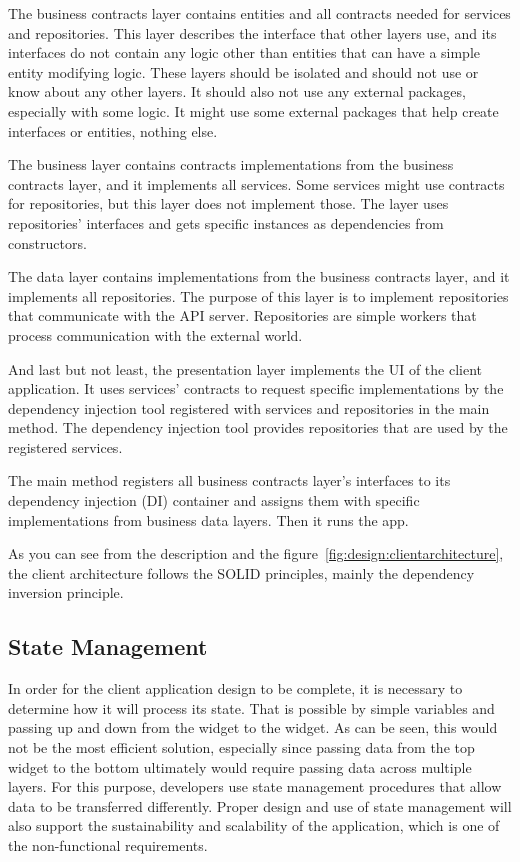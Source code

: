 The business contracts layer contains entities and all contracts needed for services and repositories.
This layer describes the interface that other layers use, and its interfaces do not contain any logic other than entities that can have a simple entity modifying logic.
These layers should be isolated and should not use or know about any other layers.
It should also not use any external packages, especially with some logic.
It might use some external packages that help create interfaces or entities, nothing else.

The business layer contains contracts implementations from the business contracts layer, and it implements all services.
Some services might use contracts for repositories, but this layer does not implement those.
The layer uses repositories' interfaces and gets specific instances as dependencies from constructors.

The data layer contains implementations from the business contracts layer, and it implements all repositories.
The purpose of this layer is to implement repositories that communicate with the API server.
Repositories are simple workers that process communication with the external world.

And last but not least, the presentation layer implements the UI of the client application.
It uses services' contracts to request specific implementations by the dependency injection tool registered with services and repositories in the main method.
The dependency injection tool provides repositories that are used by the registered services.

The main method registers all business contracts layer's interfaces to its dependency injection (DI) container and assigns them with specific implementations from business data layers.
Then it runs the app.

As you can see from the description and the figure~\ref{fig:design:clientarchitecture}, the client architecture follows the SOLID principles, mainly the dependency inversion principle. 

\subsection{State Management}

In order for the client application design to be complete, it is necessary to determine how it will process its state.
That is possible by simple variables and passing up and down from the widget to the widget.
As can be seen, this would not be the most efficient solution, especially since passing data from the top widget to the bottom ultimately would require passing data across multiple layers.
For this purpose, developers use state management procedures that allow data to be transferred differently.
Proper design and use of state management will also support the sustainability and scalability of the application, which is one of the non-functional requirements.

